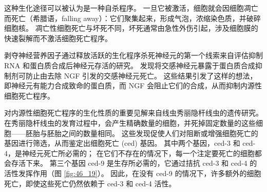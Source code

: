 这种生化途径可以被认为是一种自杀程序。 一旦它被激活，细胞就会因细胞凋亡而死亡（希腊语，falling away）：它们聚集起来，形成气泡，浓缩染色质，并破碎细胞核。 凋亡性细胞死亡与坏死不同，坏死通常由急性外伤引起，涉及细胞膜的快速裂解而不激活细胞死亡程序。

剥夺神经营养因子通过释放活跃的生化程序杀死神经元的第一个线索来自评估抑制 RNA 和蛋白质合成后神经元存活的研究。 发现将交感神经元暴露于蛋白质合成抑制剂可防止由去除 NGF 引发的交感神经元死亡。 这些结果引发了这样的想法，即神经元有能力合成致命的蛋白质，而 NGF 会阻止它们的合成，从而抑制内源性细胞死亡程序。

对内源性细胞死亡程序的生化性质的重要见解来自线虫秀丽隐杆线虫的遗传研究。 在秀丽隐杆线虫的发育过程中，会产生精确数量的细胞，并死掉固定数量的这些细胞——胚胎与胚胎之间的数量相同。 这些发现促使人们对阻断或增强细胞死亡的基因进行筛选，从而鉴定出细胞死亡 (ced) 基因。 其中两个基因，ced-3 和 ced-4，是神经元死亡所必需的； 在它们不存在的情况下，每一个注定要死亡的细胞都会存活下来。 
第三个基因 ced-9 是生存所必需的，它通过拮抗 ced-3 和 ced-4 的活性发挥作用（图 \ref{fig:46_19}）。 
因此，在没有 ced-9 的情况下，许多额外的细胞死亡，即使这些死亡仍然依赖于 ced-3 和 ced-4 活性。

